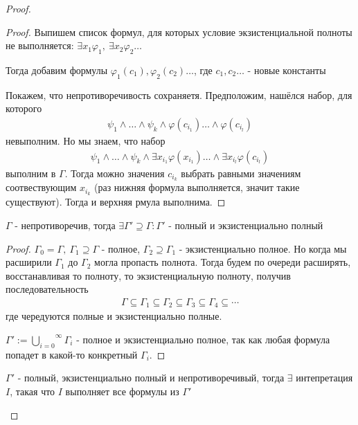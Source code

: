 \begin{proof}
    \begin{proof}
        Выпишем список формул, для которых условие экзистенциальной полноты не выполняется:
        $\exists x_1 \varphi_1,\ \exists x_2 \varphi_2 \dots$

        Тогда добавим формулы $\varphi_1(c_1), \varphi_2(c_2) \dots$, где $c_1, c_2 \dots$ - новые константы

        Покажем, что непротиворечивость сохраняетя. Предположим, нашёлся набор, для которого
        \begin{gather*}
            \psi_1 \land \dots \land \psi_k \land \varphi(c_{i_1}) \dots \land \varphi(c_{i_l})
        \end{gather*}
        невыполним. Но мы знаем, что набор
        \begin{gather*}
            \psi_1 \land \dots \land \psi_k \land \exists x_{i_1} \varphi(x_{i_1}) \dots \land  \exists x_{i_l} \varphi(c_{i_l})
        \end{gather*}
        выполним в $\Gamma$. Тогда можно значения $c_{i_k}$ выбрать равными
        значениям соотвествующим $x_{i_k}$ (раз нижняя формула выполняется, значит такие существуют). Тогда и верхняя рмула выполнима.
    \end{proof}

\begin{lemma}
    $\Gamma$ - непротиворечив, тогда $\exists \Gamma' \supseteq \Gamma : \Gamma'$ - полный и экзистенциально полный
\end{lemma}

\begin{proof}
    $\Gamma_0 = \Gamma,\ \Gamma_1 \supseteq \Gamma$ - полное, $\Gamma_2 \supseteq \Gamma_1$ - экзистенциально полное. Но когда мы
    расширили $\Gamma_1$ до $\Gamma_2$ могла пропасть полнота. Тогда будем по очереди расширять, восстанавливая то полноту, то экзистенциальную полноту, получив последовательность
    \begin{gather*}
        \Gamma \subseteq \Gamma_1 \subseteq \Gamma_2 \subseteq \Gamma_3 \subseteq \Gamma_4 \subseteq \cdots
    \end{gather*}
    где чередуются полные и экзистенциально полные.

    $\Gamma' := \overset{\infty}{\underset{i = 0}{\bigcup}} \Gamma_i$ - полное и экзистенциально полное, так как любая формула попадет в какой-то конкретный $\Gamma_i$.
\end{proof}

\begin{lemma}
    $\Gamma'$ - полный, экзистенциально полный и непротиворечивый, тогда $\exists$ интепретация
    $I$, такая что $I$ выполняет все формулы из $\Gamma'$ 
\end{lemma}


\end{proof}
